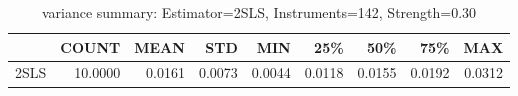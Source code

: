 \begin{table}[ht]
\centering
\caption{variance summary: Estimator=2SLS, Instruments=142, Strength=0.30}
\begin{tabular}{lrrrrrrrr}
\toprule
 & COUNT & MEAN & STD & MIN & 25\% & 50\% & 75\% & MAX \\
\midrule
2SLS & 10.0000 & 0.0161 & 0.0073 & 0.0044 & 0.0118 & 0.0155 & 0.0192 & 0.0312 \\
\bottomrule
\end{tabular}
\end{table}
